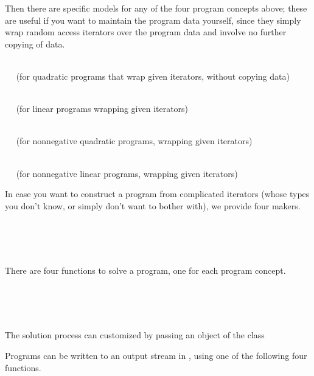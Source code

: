 Then there are specific models for any of the four program concepts above; 
these are useful if you want to maintain the program data yourself, since
they simply wrap random access iterators over the program data and involve
no further copying of data.

\\
$\quad$ (for quadratic programs that wrap given iterators, without copying 
data) 

\\
$\quad$ (for linear programs wrapping given iterators) 

\\
$\quad$ (for nonnegative quadratic programs, wrapping given iterators)

\\
$\quad$ (for nonnegative linear programs, wrapping given iterators)

In case you want to construct a program from complicated iterators
(whose types you don't know, or simply don't want to bother with), 
we provide four makers.

\\
\\
\\

There are four functions to solve a program, one for each program
concept. 

\\
\\
\\

The solution process can customized by passing an object of the class


Programs can be written to an output stream in , using
one of the following four functions.

\\
\\
\\
